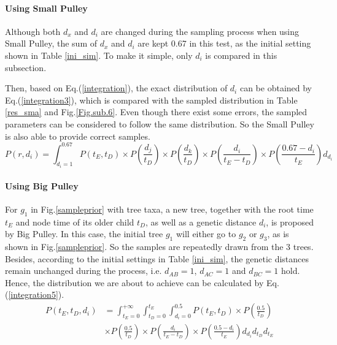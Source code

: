 \documentclass{bmcart}
\begin{document}
\paragraph*{Using Small Pulley}

Although both ${d_x}$ and ${d_i}$ are changed during the sampling process when using Small Pulley, the sum of ${d_x}$ and ${d_i}$ are kept 0.67 in this test, as the initial setting shown in Table \ref{ini_sim}. To make it simple, only ${d_i}$ is compared in this subsection.

Then, based on Eq.(\ref{integration}), the exact distribution of ${d_i}$ can be obtained by Eq.(\ref{integration3}), which is compared with the sampled distribution in Table \ref{res_sma} and Fig.\ref{Fig.sub.6}. Even though there exist some errors, the sampled parameters can be considered to follow the same distribution. So the Small Pulley is also able to provide correct samples.
\begin{equation}\label{integration3}
P(r,{d_i}) = \int_{{d_i} = 1}^{0.67} {P({t_E},{t_D}) \times P(\frac{{{d_j}}}{{{t_D}}}) \times P(\frac{{{d_k}}}{{{t_D}}}) \times P(\frac{{{d_i}}}{{{t_E} - {t_D}}}) \times P(\frac{{0.67 - {d_i}}}{{{t_E}}}){d_{d_i}}}
\end{equation}

\paragraph*{Using Big Pulley}

For $g_1$ in Fig.\ref{sampleprior} with tree taxa, a new tree, together with the root time $t_E$ and node time of its older child $t_D$, as well as a genetic distance $d_i$, is proposed by Big Pulley. In this case, the initial tree $g_1$ will either go to $g_2$ or $g_3$, as is shown in Fig.\ref{sampleprior}.  So the samples are repeatedly drawn from the 3 trees. Besides, according to the initial settings in Table \ref{ini_sim}, the genetic distances remain unchanged during the process, i.e. $d_{AB} = 1$, $d_{AC}  = 1$ and $d_{BC} = 1$ hold. Hence, the distribution we are about to achieve can be calculated by Eq.(\ref{integration5}).
\begin{equation}\label{integration5}
\begin{aligned}
P({t_E},{t_D},{d_i}) &= \int_{{t_E} = 0}^{ + \infty } {\int_{{t_D} = 0}^{{t_E}} {\int_{{d_i} = 0}^{0.5} {P({t_E},{t_D})} } \times P(\frac{{0.5}}{{{t_D}}})}  \\&\times P(\frac{{0.5}}{{{t_D}}}) \times P(\frac{{{d_i}}}{{{t_E} - {t_D}}}) \times P(\frac{{0.5 - {d_i}}}{{{t_E}}}){d_{d_i}}{d_{t_D}}{d_{t_E}}
\end{aligned}
\end{equation}
\end{document}
